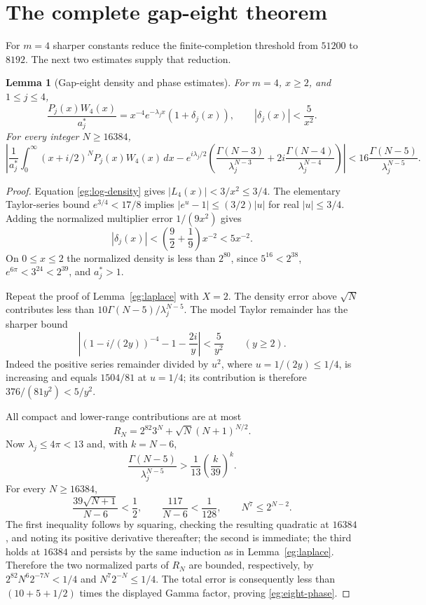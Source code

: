 \documentclass[11pt,a4paper]{article}
\numberwithin{equation}{section}
\newtheorem{lemma}[theorem]{Lemma}
\theoremstyle{definition}
\theoremstyle{remark}
\begin{document}
\section{The complete gap-eight theorem}
\label{eg:gap-eight}

For $m=4$ sharper constants reduce the finite-completion threshold
from $51200$ to $8192$.  The next two estimates supply that reduction.

\begin{lemma}[Gap-eight density and phase estimates]
\label{eg:eight-laplace}
For $m=4$, $x\ge2$, and $1\le j\le4$,
\[
 \frac{P_j(x)W_4(x)}{a_j^*}
    =x^{-4}e^{-\lambda_jx}(1+\delta_j(x)),\qquad
 |\delta_j(x)|<\frac5{x^2}.
\]
For every integer $N\ge16384$,
\begin{equation}\label{eg:eight-phase}
 \left|\frac1{a_j^*}\int_0^\infty(x+i/2)^NP_j(x)W_4(x)\,dx
 -e^{i\lambda_j/2}
     \left(\frac{\Gamma(N-3)}{\lambda_j^{N-3}}
            +2i\frac{\Gamma(N-4)}{\lambda_j^{N-4}}\right)\right|
       <16\frac{\Gamma(N-5)}{\lambda_j^{N-5}}.
\end{equation}
\end{lemma}

\begin{proof}
Equation \eqref{eg:log-density} gives $|L_4(x)|<3/x^2\le3/4$.
The elementary Taylor-series bound $e^{3/4}<17/8$ implies
$|e^u-1|\le(3/2)|u|$ for real $|u|\le3/4$.  Adding the
normalized multiplier error $1/(9x^2)$ gives
\[
 |\delta_j(x)|<\left(\frac92+\frac19\right)x^{-2}<5x^{-2}.
\]
On $0\le x\le2$ the normalized density is less than $2^{80}$,
since $5^{16}<2^{38}$, $e^{6\pi}<3^{24}<2^{39}$, and $a_j^*>1$.

Repeat the proof of Lemma~\ref{eg:laplace} with $X=2$.  The
density error above $\sqrt N$ contributes less than
$10\Gamma(N-5)/\lambda_j^{N-5}$.  The model Taylor remainder
has the sharper bound
\[
 \left|(1-i/(2y))^{-4}-1-\frac{2i}{y}\right|<\frac5{y^2}
       \qquad(y\ge2).
\]
Indeed the positive series remainder divided by $u^2$, where
$u=1/(2y)\le1/4$, is increasing and equals $1504/81$ at $u=1/4$;
its contribution is therefore $376/(81y^2)<5/y^2$.

All compact and lower-range contributions are at most
\[
 R_N=2^{82}3^N+\sqrt N(N+1)^{N/2}.
\]
Now $\lambda_j\le4\pi<13$ and, with $k=N-6$,
\[
 \frac{\Gamma(N-5)}{\lambda_j^{N-5}}
       >\frac1{13}\left(\frac{k}{39}\right)^k.
\]
For every $N\ge16384$,
\[
 \frac{39\sqrt{N+1}}{N-6}<\frac12,\qquad
 \frac{117}{N-6}<\frac1{128},\qquad N^7\le2^{N-2}.
\]
The first inequality follows by squaring, checking the resulting
quadratic at $16384$, and noting its positive derivative thereafter;
the second is immediate; the third holds at $16384$ and persists
by the same induction as in Lemma~\ref{eg:laplace}.  Therefore
the two normalized parts of $R_N$ are bounded, respectively, by
$2^{82}N^6 2^{-7N}<1/4$ and $N^7 2^{-N}\le1/4$.
The total error is consequently less than $(10+5+1/2)$ times the
displayed Gamma factor, proving \eqref{eg:eight-phase}.
\end{proof}
\end{document}
